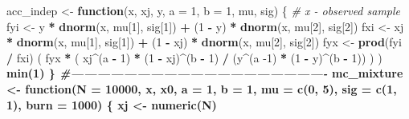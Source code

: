 \documentclass[]{book}
\newenvironment{Shaded}{\begin{snugshade}}{\end{snugshade}}
\newcommand{\CommentTok}[1]{\textcolor[rgb]{0.56,0.35,0.01}{\textit{#1}}}
\newcommand{\ControlFlowTok}[1]{\textcolor[rgb]{0.13,0.29,0.53}{\textbf{#1}}}
\newcommand{\DataTypeTok}[1]{\textcolor[rgb]{0.13,0.29,0.53}{#1}}
\newcommand{\DecValTok}[1]{\textcolor[rgb]{0.00,0.00,0.81}{#1}}
\newcommand{\KeywordTok}[1]{\textcolor[rgb]{0.13,0.29,0.53}{\textbf{#1}}}
\newcommand{\NormalTok}[1]{#1}
\newcommand{\OperatorTok}[1]{\textcolor[rgb]{0.81,0.36,0.00}{\textbf{#1}}}
\newcommand{\StringTok}[1]{\textcolor[rgb]{0.31,0.60,0.02}{#1}}
\theoremstyle{definition}
\theoremstyle{definition}
\theoremstyle{definition}
\theoremstyle{remark}
\begin{document}
\begin{Shaded}
\begin{Highlighting}[]
\NormalTok{acc_indep <-}\StringTok{ }\ControlFlowTok{function}\NormalTok{(x, xj, y, }\DataTypeTok{a =} \DecValTok{1}\NormalTok{, }\DataTypeTok{b =} \DecValTok{1}\NormalTok{, mu, sig) \{}
  \CommentTok{# x - observed sample}
\NormalTok{  fyi <-}\StringTok{ }\NormalTok{y }\OperatorTok{*}\StringTok{ }\KeywordTok{dnorm}\NormalTok{(x, mu[}\DecValTok{1}\NormalTok{], sig[}\DecValTok{1}\NormalTok{]) }\OperatorTok{+}\StringTok{ }\NormalTok{(}\DecValTok{1} \OperatorTok{-}\StringTok{ }\NormalTok{y) }\OperatorTok{*}\StringTok{ }\KeywordTok{dnorm}\NormalTok{(x, mu[}\DecValTok{2}\NormalTok{], sig[}\DecValTok{2}\NormalTok{])}
\NormalTok{  fxi <-}\StringTok{ }\NormalTok{xj }\OperatorTok{*}\StringTok{ }\KeywordTok{dnorm}\NormalTok{(x, mu[}\DecValTok{1}\NormalTok{], sig[}\DecValTok{1}\NormalTok{]) }\OperatorTok{+}\StringTok{ }\NormalTok{(}\DecValTok{1} \OperatorTok{-}\StringTok{ }\NormalTok{xj) }\OperatorTok{*}\StringTok{ }\KeywordTok{dnorm}\NormalTok{(x, mu[}\DecValTok{2}\NormalTok{], sig[}\DecValTok{2}\NormalTok{])}
\NormalTok{  fyx <-}\StringTok{ }\KeywordTok{prod}\NormalTok{(fyi }\OperatorTok{/}\StringTok{ }\NormalTok{fxi)}
\NormalTok{  ( fyx }\OperatorTok{*}\StringTok{ }\NormalTok{( xj}\OperatorTok{^}\NormalTok{(a }\OperatorTok{-}\StringTok{ }\DecValTok{1}\NormalTok{) }\OperatorTok{*}\StringTok{ }\NormalTok{(}\DecValTok{1} \OperatorTok{-}\StringTok{ }\NormalTok{xj)}\OperatorTok{^}\NormalTok{(b }\OperatorTok{-}\StringTok{ }\DecValTok{1}\NormalTok{) }\OperatorTok{/}\StringTok{ }\NormalTok{(y}\OperatorTok{^}\NormalTok{(a }\DecValTok{-1}\NormalTok{) }\OperatorTok{*}\StringTok{ }\NormalTok{(}\DecValTok{1} \OperatorTok{-}\StringTok{ }\NormalTok{y)}\OperatorTok{^}\NormalTok{(b }\OperatorTok{-}\StringTok{ }\DecValTok{1}\NormalTok{)) ) ) }\OperatorTok{%
\StringTok{    }\KeywordTok{min}\NormalTok{(}\DecValTok{1}\NormalTok{)}
\NormalTok{\}}
\CommentTok{#----------------------------------------------------------}
\NormalTok{mc_mixture <-}\StringTok{ }\ControlFlowTok{function}\NormalTok{(}\DataTypeTok{N =} \DecValTok{10000}\NormalTok{, x, x0, }\DataTypeTok{a =} \DecValTok{1}\NormalTok{, }\DataTypeTok{b =} \DecValTok{1}\NormalTok{, }\DataTypeTok{mu =} \KeywordTok{c}\NormalTok{(}\DecValTok{0}\NormalTok{, }\DecValTok{5}\NormalTok{), }\DataTypeTok{sig =} \KeywordTok{c}\NormalTok{(}\DecValTok{1}\NormalTok{, }\DecValTok{1}\NormalTok{), }\DataTypeTok{burn =} \DecValTok{1000}\NormalTok{) \{}
\NormalTok{  xj <-}\StringTok{ }\KeywordTok{numeric}\NormalTok{(N)}
}
\end{Highlighting}
\end{Shaded}
\end{document}
